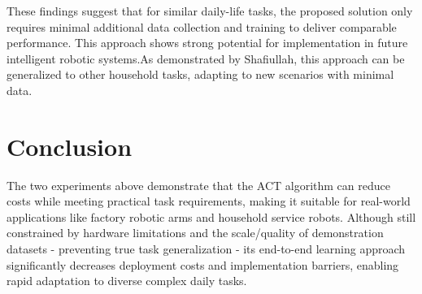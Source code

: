 \documentclass[runningheads]{llncs}
\begin{document}
These findings suggest that for similar daily-life tasks, the proposed solution only requires minimal additional data collection and training to deliver comparable performance. This approach shows strong potential for implementation in future intelligent robotic systems.As demonstrated by Shafiullah\cite{ref17}, this approach can be generalized to other household tasks, adapting to new scenarios with minimal data.


\section{Conclusion}
The two experiments above demonstrate that the ACT algorithm can reduce costs while meeting practical task requirements, making it suitable for real-world applications like factory robotic arms and household service robots. Although still constrained by hardware limitations and the scale/quality of demonstration datasets - preventing true task generalization - its end-to-end learning approach significantly decreases deployment costs and implementation barriers, enabling rapid adaptation to diverse complex daily tasks.






\end{document}
